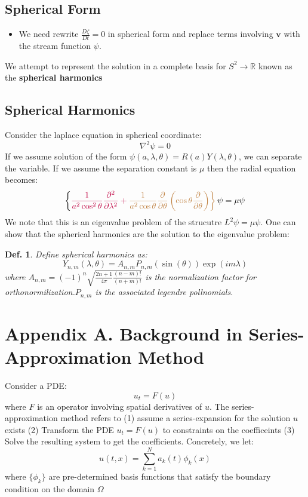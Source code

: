\documentclass[14pt, twocolumn]{article}
\newtheorem{df}{Def.}
\newenvironment{tbox}{
    \begin{tcolorbox}[sharp corners, colback=white]
    
}{
    \end{tcolorbox}
}
\begin{document}
\subsection{Spherical Form}
\begin{itemize}
    \item We need rewrite 
    $
        \frac{D\zeta}{Dt}=0
    $
    in spherical form and replace terms involving $\mathbf{v}$ with the stream function $\psi$.
\end{itemize}

We attempt to represent the solution in a complete basis for $S^2\to \mathbb{R}$ known as the \textbf{spherical harmonics}

\subsection{Spherical Harmonics}
Consider the laplace equation in spherical coordinate:
$$
\nabla^2 \psi = 0 
$$
If we assume solution of the form $\psi(a,\lambda,\theta)=R(a)Y(\lambda,\theta)$, we can separate 
the variable. If we assume the separation constant is $\mu$ then the radial equation becomes:
\begin{equation}
    \left\{\color{purple}{\frac{1}{a^2\cos^2 \theta} \frac{\partial^2}{\partial \lambda^2}}  +
                          \color{brown}{\frac{1}{a^2\cos\theta}\frac{\partial }{\partial \theta}\left(\cos  \theta  \frac{\partial}{\partial \theta}\right)}  \right\} \psi = \mu\psi
\end{equation}
We note that this is an eigenvalue problem of the strucutre $L^2\psi = \mu \psi$. One can show that the spherical harmonics are
the solution to the eigenvalue problem:
\begin{tbox}
    \begin{df}
       Define spherical harmonics as:
        \begin{equation}
            Y_{n,m}(\lambda,\theta)=A_{n,m}P_{n,m}(\sin(\theta))\exp(im\lambda)
        \end{equation}
        where $A_{n,m} = (-1)^n\sqrt{\frac{2n+1}{4\pi}\frac{(n-m)!}{(n+m)!}}$ is the normalization factor 
        for orthonormilization.$P_{n,m}$ is the associated legendre pollnomials.
    \end{df}
\end{tbox}

\section{Appendix A. Background in Series-Approximation Method}
Consider a PDE:
\begin{equation}
    u_t = F(u)
\end{equation}
where $F$ is an operator involving spatial derivatives of $u$. 
The series-approximation method refers to (1) assume a series-expansion for the solution $u$ exists (2) Transform 
the PDE $u_t=F(u)$ to constraints on the coefficeints (3) Solve the resulting system to get the coefficients.
Concretely, we let:
$$
u(t,x)=\sum_{k=1}^N a_k(t) \phi_k(x)
$$
where $\{\phi_k\}$ are pre-determined basis functions that satisfy the boundary condition on the domain $\Omega$
\end{document}
